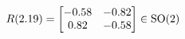 \documentclass[preview]{standalone}
\begin{document}
\begin{align*}
\special{dvisvgm:raw <g id='unique000'>}R(2.19) = \begin{bmatrix} -0.58 & -0.82 \\ 0.82 & -0.58 \end{bmatrix} \in \text{SO}(2)\special{dvisvgm:raw </g>}
\end{align*}
\end{document}
